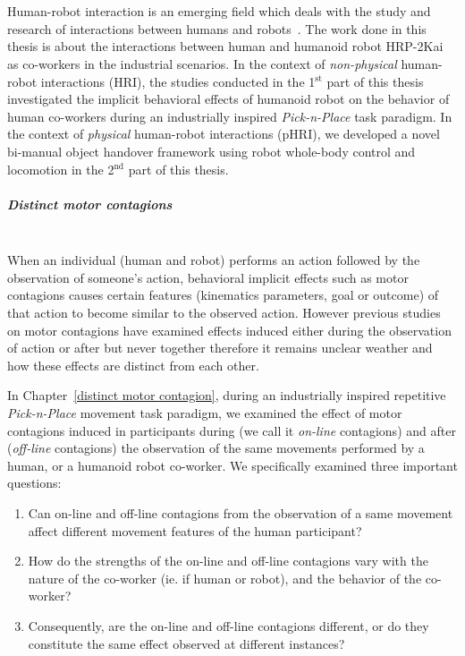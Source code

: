 {\color{blue}\chapter*{}}
\thispagestyle{empty}

Human-robot interaction is an emerging field which deals with the study and research of interactions between humans and robots~\cite{goodrich2008human}. The work done in this thesis is about the interactions between human and humanoid robot HRP-2Kai as co-workers in the industrial scenarios. In the context of \textit{non-physical} human-robot interactions (HRI), the studies conducted in the 1$^\text{st}$ part of this thesis investigated the implicit behavioral effects of humanoid robot on the behavior of human co-workers during an industrially inspired \textit{Pick-n-Place} task paradigm. In the context of \textit{physical} human-robot interactions (pHRI), we developed a novel bi-manual object handover framework using robot whole-body control and locomotion in the 2$^\text{nd}$ part of this thesis.\\

\paragraph*{\LARGE {Distinct motor contagions \\}\\}

When an individual (human and robot) performs an action followed by the observation of someone's action, behavioral implicit effects such as motor contagions causes certain features (kinematics parameters, goal or outcome) of that action to become similar to the observed action. However previous studies on motor contagions have examined  effects induced either during the observation of action or after but never together therefore it remains unclear weather and how these effects are distinct from each other.

In Chapter~\ref{distinct motor contagion}, during an industrially inspired repetitive \textit{Pick-n-Place} movement task paradigm, we examined the effect of motor contagions induced in participants during (we call it \textit{on-line} contagions) and after (\textit{off-line} contagions) the observation of the same movements performed by a human, or a humanoid robot co-worker. We specifically examined three important questions:

\begin{enumerate}
	\item Can on-line and off-line contagions from the observation of a same movement affect different movement features of the human participant?
	\item How do the strengths of the on-line and off-line contagions vary with the nature of the co-worker (ie. if human or robot), and the behavior of the co-worker?
	\item Consequently, are the on-line and off-line contagions different, or do they constitute the same effect observed at different instances?
\end{enumerate}

